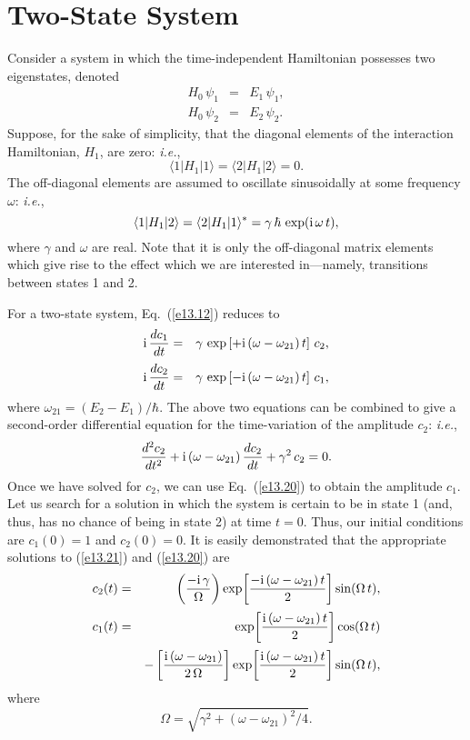 \section{Two-State System}
Consider a system in which the time-independent Hamiltonian possesses
two eigenstates, denoted
\begin{eqnarray}
H_0\,\psi_1 &=& E_1\,\psi_1,\\[0.5ex]
H_0\,\psi_2&=&E_2\,\psi_2.
\end{eqnarray}
Suppose, for the sake of simplicity, that the diagonal elements of
the interaction Hamiltonian, $H_1$, are zero: {\em i.e.},
\begin{equation}
\langle 1|H_1|1\rangle = \langle 2|H_1|2\rangle = 0.
\end{equation}
The off-diagonal elements are assumed to oscillate sinusoidally 
at some frequency $\omega$: {\em i.e.},
\begin{equation}
\langle 1|H_1|2\rangle = \langle 2|H_1|1\rangle^\ast = \gamma\,\hbar\,\exp({\rm i}\,\omega\,t),
\end{equation}
where $\gamma$ and $\omega$ are real. Note that it is only the off-diagonal
matrix elements which give rise to the effect which we are interested
in---namely, transitions between states 1 and 2.

For a two-state system, Eq.~(\ref{e13.12}) reduces to
\begin{eqnarray}
{\rm i}\,\frac{dc_1}{dt} &=& \gamma\,\exp\left[+{\rm i}\,(\omega-\omega_{21})\,t\right]\,c_2,\\[0.5ex]
{\rm i}\,\frac{dc_2}{dt} &=&\gamma\,\exp\left[-{\rm i}\,(\omega-\omega_{21})\,t\right]\,c_1,\label{e13.20}
\end{eqnarray}
where $\omega_{21}=(E_2-E_1)/\hbar$. The above two equations can be combined to give a second-order
differential equation for the time-variation of the amplitude $c_2$: {\em i.e.},
\begin{equation}\label{e13.21}
\frac{d^2 c_2}{dt^2} + {\rm i}\,(\omega-\omega_{21})\,\frac{dc_2}{dt}+\gamma^2\,c_2=0.
\end{equation}
Once we have solved for $c_2$, we can use Eq.~(\ref{e13.20})
to obtain the amplitude $c_1$. Let us search for a solution
in which the system is certain to be in state 1 (and, thus, has
no chance of being in state 2) at time $t=0$. 
Thus, our initial conditions are $c_1(0)=1$ and $c_2(0)=0$. 
It is easily demonstrated that the appropriate solutions to (\ref{e13.21}) and
(\ref{e13.20}) are 
\begin{eqnarray}
c_2(t)&=& \left(\frac{-{\rm i}\,\gamma}{\Omega}\right)\exp\!\left[\frac{-{\rm i}\,(\omega-\omega_{21})\,t}{2}\right]\sin(\Omega\,t),\\[0.5ex]
c_1(t)&=& \exp\!\left[\frac{{\rm i}\,(\omega-\omega_{21})\,t}{2}\right]
\cos(\Omega\,t)\nonumber\\[0.5ex]
&& - \left[\frac{{\rm i}\,(\omega-\omega_{21})}{2\,\Omega} \right]\exp\!\left[\frac{{\rm i}\,(\omega-\omega_{21})\,t}{2}\right]\sin(\Omega\,t),
\end{eqnarray}
where
\begin{equation}
\Omega = \sqrt{\gamma^2 + (\omega-\omega_{21})^2/4}.
\end{equation}

